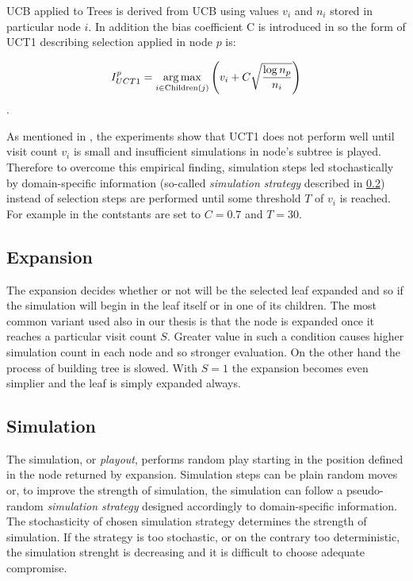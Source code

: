 UCB applied to Trees \cite{Kocsis2006} is derived from UCB using values $v_i$ and $n_i$ stored in
particular node $i$. In addition the bias coefficient C is introduced in \cite{Chaslot2008} so the form of
UCT1 describing selection applied in node $p$ is:

\begin{equation}
I_{UCT1}^p = \operatorname*{arg\,max}\limits_{i \in \mathrm{Children}(j)} \left( v_i + C \sqrt{\log{n_p} \over{n_i}}\right)
\end{equation}.

As mentioned in \cite{Chaslot2008}, the experiments show that UCT1 does not perform well until visit
count $v_i$ is small and insufficient simulations in node's subtree is played. Therefore to overcome this
empirical finding, simulation steps led stochastically by domain-specific information (so-called
\emph{simulation strategy} described in 
\ref{sec_simulation}) instead of selection steps are performed until some threshold $T$ of $v_i$
is reached. For example in \cite{Chaslot2008} the contstants are set to $C=0.7$ and $T=30$.


\subsection{Expansion}
\label{sec_expansion}

The expansion decides whether or not will be the selected leaf expanded and so if the simulation
will begin in the leaf itself or in one of its children. The most common variant used also in our
thesis is that the node is
expanded once it reaches a particular visit count $S$. Greater value in such a condition causes higher
simulation count in each node and so stronger evaluation. On the other hand the process of building
tree is slowed. With $S=1$ the expansion becomes even simplier and the leaf is simply expanded
always.


\subsection{Simulation}
\label{sec_simulation}

The simulation, or \emph{playout}, performs random play starting in the position defined in the
node returned by expansion. Simulation steps can be plain random moves or, to improve the strength of
simulation, the simulation can follow a pseudo-random \emph{simulation strategy} designed accordingly to
domain-specific information. The stochasticity of chosen simulation strategy determines the strength
of simulation. If the strategy is too stochastic, or on the contrary too deterministic, the
simulation strenght is decreasing and it is difficult to choose adequate compromise.

